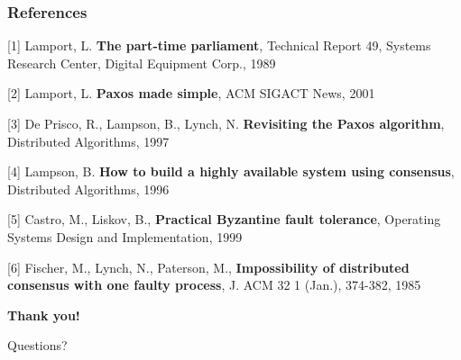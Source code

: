 \documentclass[10 pt]{beamer}
\begin{document}
\begin{frame}
  \frametitle{References}

[1] Lamport, L. \textbf{The part-time parliament}, Technical Report 49, Systems Research Center, Digital Equipment Corp., 1989

\vspace{4 mm}
[2] Lamport, L. \textbf{Paxos made simple}, ACM SIGACT News, 2001

\vspace{4 mm}
[3] De Prisco, R., Lampson, B., Lynch, N. \textbf{Revisiting the Paxos algorithm}, Distributed Algorithms, 1997

\vspace{4 mm}
[4] Lampson, B. \textbf{How to build a highly available system using consensus}, Distributed Algorithms, 1996

\vspace{4 mm}
[5] Castro, M., Liskov, B., \textbf{Practical Byzantine fault tolerance}, Operating Systems Design and Implementation, 1999

\vspace{4 mm}
[6] Fischer, M., Lynch, N., Paterson, M., \textbf{Impossibility of distributed consensus with one faulty process}, J. ACM 32 1 (Jan.), 374-382, 1985
  
\end{frame}



\begin{frame}

\begin{center}
{\Huge \textbf{Thank you!}}

\vspace{5 mm}
{\footnotesize Questions?}
\end{center}
% 

\end{frame}
\end{document}
